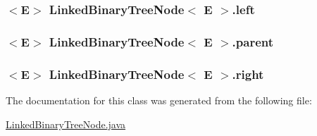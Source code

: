 \subsubsection[{\texorpdfstring{left}{left}}]{$<$E$>$ {\bf Linked\+Binary\+Tree\+Node}$<$ E $>$.left\hspace{0.3cm}{\ttfamily [protected]}}\hypertarget{class_linked_binary_tree_node_aa3fac51a9f33d5a5f6e65c0097bbadcb}{}\label{class_linked_binary_tree_node_aa3fac51a9f33d5a5f6e65c0097bbadcb}
\subsubsection[{\texorpdfstring{parent}{parent}}]{$<$E$>$ {\bf Linked\+Binary\+Tree\+Node}$<$ E $>$.parent\hspace{0.3cm}{\ttfamily [protected]}}\hypertarget{class_linked_binary_tree_node_a9781f783b1c6cda7f89339709a76a903}{}\label{class_linked_binary_tree_node_a9781f783b1c6cda7f89339709a76a903}
\subsubsection[{\texorpdfstring{right}{right}}]{$<$E$>$ {\bf Linked\+Binary\+Tree\+Node}$<$ E $>$.right\hspace{0.3cm}{\ttfamily [protected]}}\hypertarget{class_linked_binary_tree_node_a9caa5da4b6af168516202a3f38c36cc7}{}\label{class_linked_binary_tree_node_a9caa5da4b6af168516202a3f38c36cc7}


The documentation for this class was generated from the following file\+:\begin{DoxyCompactItemize}
\item 
\hyperlink{_linked_binary_tree_node_8java}{Linked\+Binary\+Tree\+Node.\+java}\end{DoxyCompactItemize}
